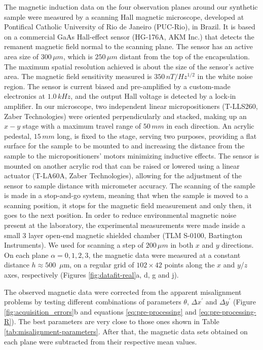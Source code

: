 \documentclass[draft,gc]{agutex}
\begin{document}
\begin{article}
The magnetic induction data on the four observation planes around our 
synthetic sample were measured by a scanning Hall magnetic microscope, 
developed at Pontifical Catholic University of Rio de Janeiro (PUC-Rio), 
in Brazil. It is based on a commercial GaAs Hall-effect sensor 
(HG-176A, AKM Inc.) that detects the remanent magnetic field normal 
to the scanning plane. The sensor has an active area size of $300 \, \mu m$, 
which is $250 \, \mu m$ distant from the top of the encapsulation. The 
maximum spatial resolution achieved is about the size of the sensor’s 
active area. The magnetic field sensitivity measured is $350 \, nT/Hz^{1/2}$ 
in the white noise region. The sensor is current biased and pre-amplified 
by a custom-made electronics at $1.0 \, kHz$, and the output Hall voltage 
is detected by a lock-in amplifier. In our microscope, two independent 
linear micropositioners (T-LLS260, Zaber Technologies) were oriented 
perpendicularly and stacked, making up an $x-y$ stage with a maximum travel 
range of $50 \, mm$ in each direction. An acrylic pedestal, $15 \, mm$ long, 
is fixed to the stage, serving two purposes, providing a flat surface for 
the sample to be mounted to and increasing the distance from the sample to 
the micropositioners’ motors minimizing inductive effects. The sensor is 
mounted on another acrylic rod that can be raised or lowered using a linear 
actuator (T-LA60A, Zaber Technologies), allowing for the adjustment of the 
sensor to sample distance with micrometer accuracy. The scanning of the 
sample is made in a stop-and-go system, meaning that when the sample is 
moved to a scanning position, it stops for the magnetic field measurement 
and only then, it goes to the next position. In order to reduce 
environmental magnetic noise present at the laboratory, the experimental 
measurements were made inside a small 3 layer open-end magnetic shielded 
chamber (TLM S-0100, Bartington Instruments). We used for scanning a step 
of $200 \, \mu m$ in both $x$ and $y$ directions. On each plane 
$\alpha = 0, 1, 2, 3$, the magnetic data were measured at a constant 
distance $h \approx 500$~$\mu$m, on a regular grid of $102 \times 42$ 
points along the $x$ and $y$/$z$ axes, respectively 
(Figures \ref{fig:datafit-real}a, d, g and j).

The observed magnetic data were corrected from the apparent misalignment 
problems by testing different combinations of parameters $\theta$, 
$\Delta x^{\prime}$ and $\Delta y^{\prime}$ 
(Figure \ref{fig:acquisition_errors}b and equations \ref{eq:pre-processing} 
and \ref{eq:pre-processing-R}). The best parameters are very close to 
those ones shown in Table \ref{tab:misalignment-parameters}. After that, 
the magnetic data sets obtained on each plane were subtracted from their 
respective mean values.


\end{article}
\end{document}
